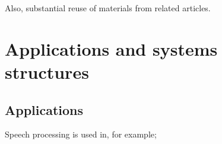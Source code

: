 \documentclass[letterpaper,10pt,english]{jupyterBook}
\begin{document}
\sphinxAtStartPar
Also, substantial reuse of materials from related
 articles.

\sphinxstepscope


\section{Applications and systems structures}
\label{\detokenize{Introduction/Applications_and_systems_structures:applications-and-systems-structures}}\label{\detokenize{Introduction/Applications_and_systems_structures::doc}}

\subsection{Applications}
\label{\detokenize{Introduction/Applications_and_systems_structures:applications}}
\sphinxAtStartPar
Speech processing is used in, for example;
\end{document}

